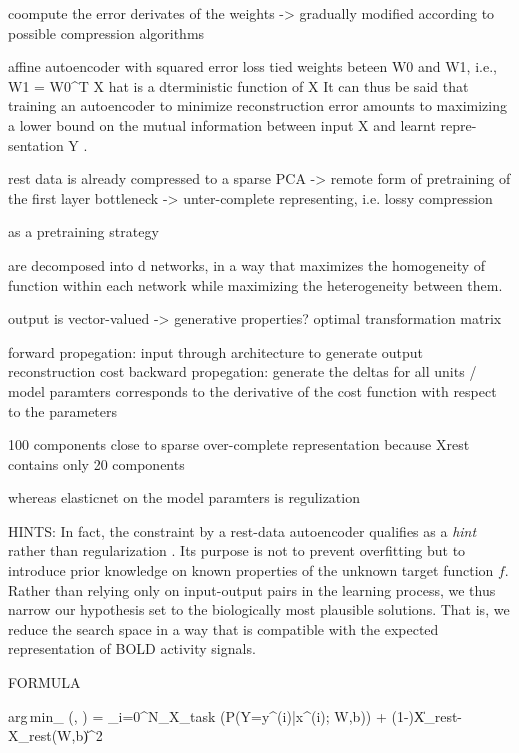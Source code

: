 \documentclass{article} %
\begin{document}
coompute the error derivates of the weights
-> gradually modified according to possible compression algorithms


affine autoencoder with squared error loss
tied weights beteen W0 and W1, i.e., W1 = W0^T
X hat is a dterministic function of X
It can thus be said that training an autoencoder to minimize reconstruction error amounts to maximizing a lower bound on the mutual information between input X and learnt repre- sentation Y .

rest data is already compressed to a sparse PCA -> remote form of 
pretraining of the first layer
bottleneck -> unter-complete representing, i.e. lossy compression

as a pretraining strategy

are decomposed into d networks,
in a way that maximizes the homogeneity of
function within each network while maximizing the heterogeneity between them.

output is vector-valued -> generative properties?
optimal transformation matrix 

forward propegation: input through architecture to generate output
reconstruction cost
backward propegation: generate the deltas for all units / model paramters
corresponds to the derivative of the cost function with respect to the parameters



100 components close to sparse over-complete representation because
Xrest contains only 20 components

whereas elasticnet on the model paramters is regulization


HINTS:
In fact, the constraint by a rest-data autoencoder qualifies as a
\textit{hint} rather than regularization \cite{abu1994hints}.
Its purpose is not to prevent overfitting but to introduce
prior knowledge on known properties of the unknown target function $f$.
Rather than relying only on input-output pairs in the learning process,
we thus narrow our hypothesis set to the biologically most plausible solutions.
That is, we reduce the search space in a way that
is compatible with the expected representation of BOLD activity signals.




FORMULA

{arg\,min}_\theta \hspace{0.2cm} {}(\theta, \lambda) = \lambda{} \sum_{i=0}^{N_{X_{task}}} \log(P(Y=y^{(i)}|x^{(i)}; W,b)) \hspace{0.2cm} + \hspace{0.2cm} (1-\lambda)\|X_{rest}-\hat X_{rest}(W,b)\|^2
\end{document}
